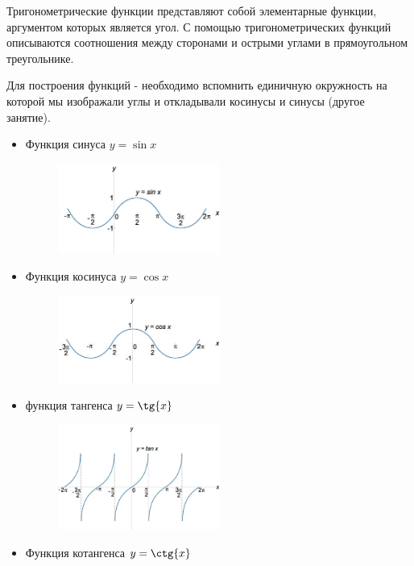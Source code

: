 Тригонометрические функции представляют собой элементарные функции, аргументом которых является угол. С помощью тригонометрических функций описываются соотношения между сторонами и острыми углами в прямоугольном треугольнике. 

Для построения функций - необходимо вспомнить единичную окружность на которой мы изображали углы и откладывали косинусы и синусы (другое занятие).

\begin{itemize}
    \item Функция синуса $y = \sin{x}$
    
    \begin{figure}[h!]
	\centering
	\includegraphics[width=0.5\textwidth]{img/sin.jpg}
    \end{figure}
    
    \item Функция косинуса $y = \cos{x}$
    
    \begin{figure}[h!]
	\centering
	\includegraphics[width=0.5\textwidth]{img/cos.jpg}
    \end{figure}
    
    \item функция тангенса $y = \tg{x}$
    
    \begin{figure}[h!]
	\centering
	\includegraphics[width=0.5\textwidth]{img/tg.jpg}
    \end{figure}
    
    \item Функция котангенса $y = \ctg{x}$
    
\end{itemize}

